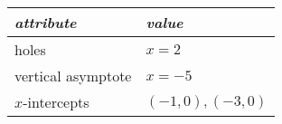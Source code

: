 {\begin{minipage}{0.35\textwidth}
{\begin{center}
\begin{tabular}{ll}
                    {\itshape\bfseries attribute} & {\itshape\bfseries value} \\
                    \midrule 
                    holes & $x=2$\\ 
                    vertical asymptote & $x = -5$\\ 
                    $x$-intercepts & $(-1,0), (-3,0)$\\
                    \bottomrule
                \end{tabular}
            \end{center}
        }
    \end{minipage}
}

